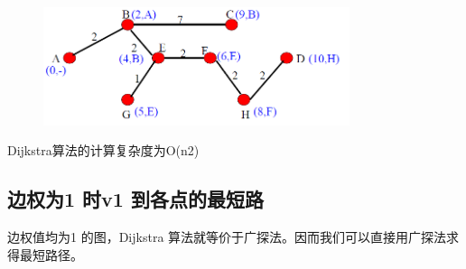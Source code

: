 \documentclass[11pt,a4paper,openany]{book}
\begin{document}
\begin{figure}[H]
  \centering
  \includegraphics[width=0.8\textwidth]{dj9.png}\\
  \caption*{}
\end{figure}
Dijkstra算法的计算复杂度为O(n2)\\
\subsection{边权为1 时v1 到各点的最短路}
\indent 边权值均为1 的图，Dijkstra 算法就等价于广探法。因而我们可以直接用广探法求得最短路径。\\
\end{document}
